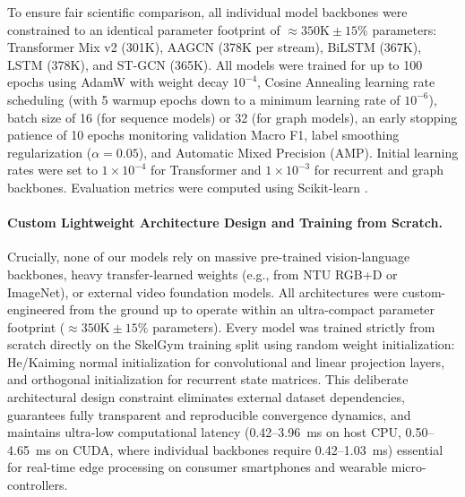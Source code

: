 \documentclass[runningheads]{llncs}
\begin{document}
To ensure fair scientific comparison, all individual model backbones were constrained to an identical parameter footprint of $\approx 350\text{K} \pm 15\%$ parameters: Transformer Mix v2 (301K), AAGCN (378K per stream), BiLSTM (367K), LSTM (378K), and ST-GCN (365K). All models were trained for up to 100 epochs using AdamW \cite{loshchilov2018} with weight decay $10^{-4}$, Cosine Annealing learning rate scheduling (with 5 warmup epochs down to a minimum learning rate of $10^{-6}$), batch size of 16 (for sequence models) or 32 (for graph models), an early stopping patience of 10 epochs monitoring validation Macro F1, label smoothing regularization \cite{szegedy2016} ($\alpha = 0.05$), and Automatic Mixed Precision (AMP). Initial learning rates were set to $1 \times 10^{-4}$ for Transformer and $1 \times 10^{-3}$ for recurrent and graph backbones. Evaluation metrics were computed using Scikit-learn \cite{pedregosa2011}.

\paragraph{Custom Lightweight Architecture Design and Training from Scratch.} Crucially, none of our models rely on massive pre-trained vision-language backbones, heavy transfer-learned weights (e.g., from NTU RGB+D or ImageNet), or external video foundation models. All architectures were custom-engineered from the ground up to operate within an ultra-compact parameter footprint ($\approx 350\text{K} \pm 15\%$ parameters). Every model was trained strictly from scratch directly on the SkelGym training split using random weight initialization: He/Kaiming normal initialization \cite{he2015delving} for convolutional and linear projection layers, and orthogonal initialization for recurrent state matrices. This deliberate architectural design constraint eliminates external dataset dependencies, guarantees fully transparent and reproducible convergence dynamics, and maintains ultra-low computational latency (0.42--3.96~ms on host CPU, 0.50--4.65~ms on CUDA, where individual backbones require 0.42--1.03~ms) essential for real-time edge processing on consumer smartphones and wearable micro-controllers.
\end{document}

